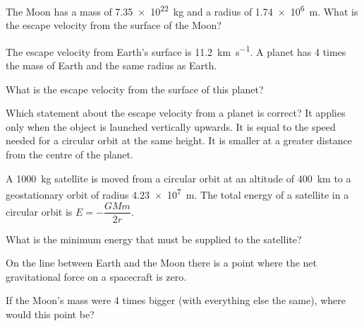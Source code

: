 \begin{quizq}{}
The Moon has a mass of \qty{7.35e22}{kg} and a radius of \qty{1.74e6}{m}. What is the escape velocity
from the surface of the Moon?
\end{quizq}

\begin{quizq}{}
The escape velocity from Earth's surface is \qty{11.2}{km.s^{-1}}. A planet has 4 times the mass of
Earth and the same radius as Earth.

What is the escape velocity from the surface of this planet?
\end{quizq}

\begin{quizq}{}
Which statement about the escape velocity from a planet is correct?
  {It applies only when the object is launched vertically upwards.}
  {It is equal to the speed needed for a circular orbit at the same height.}
  {It is smaller at a greater distance from the centre of the planet.}
\end{quizq}

\begin{quizq}{}
A \qty{1000}{kg} satellite is moved from a circular orbit at an altitude of \qty{400}{km} to a
geostationary orbit of radius \qty{4.23e7}{m}. The total energy of a satellite in a circular orbit is
$E = -\dfrac{GMm}{2r}$.

What is the minimum energy that must be supplied to the satellite?
\end{quizq}

\begin{quizq}{}
On the line between Earth and the Moon there is a point where the net gravitational force on a
spacecraft is zero.

If the Moon's mass were 4 times bigger (with everything else the same), where would this point be?
\end{quizq}

